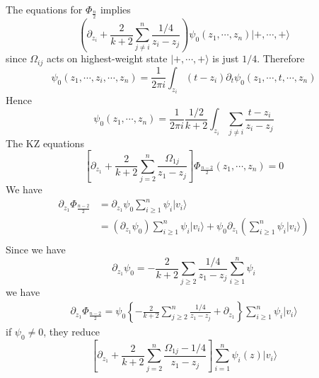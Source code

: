 \subsubsection{}
\subsubsection{}
The equations for $\Phi_{\frac{n}{2}}$ implies
\begin{equation}
	\left(\partial_{z_i} + \frac{2}{k+2}\sum_{j\neq i}^n \frac{1/4}{z_i - z_j} \right) \psi_0(z_1, \cdots, z_n) |+,\cdots,+\rangle
\end{equation}
since $\Omega_{ij}$ acts on highest-weight state $|+, \cdots,+\rangle$ is just $1/4$. Therefore
\begin{equation}
	\psi_0 (z_1,\cdots, z_i, \cdots, z_n) = \frac{1}{2\pi i } \int_{z_i} (t-z_i) \partial_{t}\psi_0(z_1,\cdots, t,\cdots, z_n)
\end{equation}
Hence 
\begin{equation}
	\psi_0(z_1,\cdots,z_n) = \frac{1}{2\pi i} \frac{1/2}{k+2}\int_{z_i} \sum_{j\neq i} \frac{t-z_i}{z_i -z_j}
\end{equation}
The KZ equations 
\begin{equation}
	\left[ \partial_{z_1} + \frac{2}{k+2} \sum^n_{j=2} \frac{\Omega_{1j}}{z_1 - z_j} \right] \Phi_{\frac{n-2}{2}} (z_1, \cdots, z_n) =0
\end{equation}
We have 
\begin{equation}
	\begin{split}
	\partial_{z_1} \Phi_{\frac{n-2}{2}} & = \partial_{z_1} \psi_0 \sum_{i\geq 1}^{n} \psi_i |v_i \rangle\\
		& = \left( \partial_{z_1} \psi_0 \right) \sum_{i \geq 1}^n \psi_i |v_i \rangle + \psi_0 \partial_{z_1}\left( \sum_{i \geq 1}^{n} \psi_i |v_i \rangle \right)\\
	\end{split}
\end{equation}
Since we have 
\begin{equation}
\partial_{z_1 } \psi_0 = - \frac{2}{k+2} \sum_{j \geq 2} \frac{1/4}{z_1 -z_j} \sum_{i \geq 1}^n \psi_i
\end{equation}
we have 
\begin{equation}
\begin{split}
 \partial_{z_1} \Phi_{\frac{n-2}{2}} = \psi_0 \left\{ - \frac{2}{k+2} \sum_{j \geq 2}^n \frac{1/4}{z_1 - z_j}  + \partial_{z_1} \right\}\sum_{i \geq 1}^n \psi_i |v_i \rangle
\end{split}
\end{equation}
if $\psi_0 \neq 0$, they reduce
\begin{equation}
\label{eq67}
	\left[ \partial_{z_1} + \frac{2}{k+2} \sum^n_{j=2} \frac{\Omega_{1j}-1/4 }{z_1 - z_j} \right] \sum_{i=1}^{n}\psi_i(z)|v_i \rangle
\end{equation}

